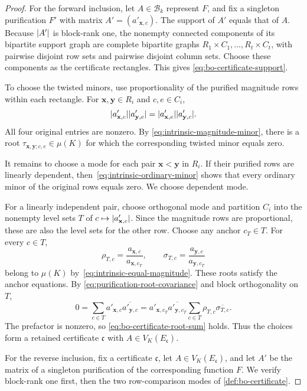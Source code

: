 \documentclass[11pt,letterpaper,onecolumn]{article}
\theoremstyle{plain}
\theoremstyle{definition}
\theoremstyle{remark}
\DeclarePairedDelimiter{\abs}{\lvert}{\rvert}
\begin{document}
\begin{proof}
For the forward inclusion, let $A\in\mathcal B_k$ represent $F$, and fix a singleton purification
$F'$ with matrix $A'=(a'_{\mathbf x,c})$.  The support of $A'$ equals
that of $A$.
Because $\abs{A'}$ is block-rank one, the nonempty connected components of its
bipartite support graph are complete bipartite graphs $R_1\times C_1,\ldots,R_t\times C_t$, with pairwise disjoint row sets and pairwise disjoint column sets.  Choose
these components as the certificate rectangles.  This gives
\eqref{eq:bo-certificate-support}.

To choose the twisted minors, use proportionality of the purified
magnitude rows within each rectangle.  For
$\mathbf x,\mathbf y\in R_i$ and $c,e\in C_i$,
\[
  \abs{a'_{\mathbf x,c}}\abs{a'_{\mathbf y,e}}
  =\abs{a'_{\mathbf x,e}}\abs{a'_{\mathbf y,c}}.
\]
All four original entries are nonzero.  By
\eqref{eq:intrinsic-magnitude-minor}, there is a root
$\tau_{\mathbf x,\mathbf y;c,e}\in\mu(K)$ for which the corresponding
twisted minor equals zero.

It remains to choose a mode for each pair $\mathbf x<\mathbf y$ in $R_i$.
If their purified rows are linearly
dependent, then~\eqref{eq:intrinsic-ordinary-minor} shows that every ordinary
minor of the original rows equals zero.  We choose dependent mode.

For a linearly independent pair, choose orthogonal mode and partition
$C_i$ into the nonempty level sets
$T$ of $c\mapsto\abs{a'_{\mathbf x,c}}$.  Since the magnitude rows are
proportional, these are also the level sets for the other row.  Choose any
anchor $c_T\in T$.  For every $c\in T$,
\[
  \rho_{T,c}=\frac{a_{\mathbf x,c}}{a_{\mathbf x,c_T}},
  \qquad
  \sigma_{T,c}=\frac{a_{\mathbf y,c}}{a_{\mathbf y,c_T}}
\]
belong to $\mu(K)$ by~\eqref{eq:intrinsic-equal-magnitude}.  These roots
satisfy the anchor equations.  By
\eqref{eq:purification-root-covariance} and block orthogonality on $T$,
\[
  0=\sum_{c\in T}a'_{\mathbf x,c}\overline{a'_{\mathbf y,c}}
   =a'_{\mathbf x,c_T}\overline{a'_{\mathbf y,c_T}}
    \sum_{c\in T}\rho_{T,c}\overline{\sigma_{T,c}}.
\]
The prefactor is nonzero, so
\eqref{eq:bo-certificate-root-sum} holds.  Thus the choices form a retained
certificate $\mathfrak c$ with $A\in V_K(E_{\mathfrak c})$.

For the reverse inclusion, fix a certificate $\mathfrak c$, let
$A\in V_K(E_{\mathfrak c})$, and let $A'$ be the matrix of a singleton
purification of the corresponding function $F$.  We verify block-rank one
first, then the two row-comparison modes of \cref{def:bo-certificate}.


\end{proof}
\end{document}
